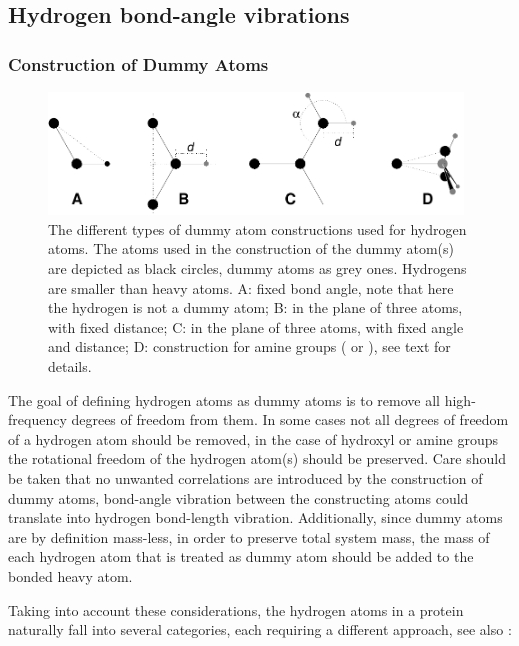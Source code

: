 \subsection{Hydrogen bond-angle vibrations}
\label{sec:dummyhydro}
\subsubsection{Construction of Dummy Atoms} %
\begin{figure}
\centerline{\includegraphics[width=11cm]{plots/dumtypes}}
\caption[Dummy atom constructions for hydrogen atoms.]{The different
types of dummy atom constructions used for hydrogen atoms. The atoms
used in the construction of the dummy atom(s) are depicted as black
circles, dummy atoms as grey ones. Hydrogens are smaller than heavy
atoms. {\sf A}: fixed bond angle, note that here the hydrogen is not a
dummy atom; {\sf B}: in the plane of three atoms, with fixed distance;
{\sf C}: in the plane of three atoms, with fixed angle and distance;
{\sf D}: construction for amine groups ({\amine} or {\aminep}), see
text for details.}
\label{fig:dumhydro}
\end{figure}

The goal of defining hydrogen atoms as dummy atoms is to remove all
high-frequency degrees of freedom from them. In some cases not all
degrees of freedom of a hydrogen atom should be removed, {\eg} in the
case of hydroxyl or amine groups the rotational freedom of the
hydrogen atom(s) should be preserved. Care should be taken that no
unwanted correlations are introduced by the construction of dummy
atoms, {\eg} bond-angle vibration between the constructing atoms could
translate into hydrogen bond-length vibration. Additionally, since
dummy atoms are by definition mass-less, in order to preserve total
system mass, the mass of each hydrogen atom that is treated as dummy
atom should be added to the bonded heavy atom.

Taking into account these considerations, the hydrogen atoms in a
protein naturally fall into several categories, each requiring a
different approach, see also :

